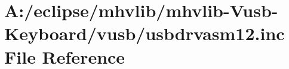 \hypertarget{mhvlib-_vusb-_keyboard_2vusb_2usbdrvasm12_8inc}{\section{A\-:/eclipse/mhvlib/mhvlib-\/\-Vusb-\/\-Keyboard/vusb/usbdrvasm12.inc File Reference}
\label{mhvlib-_vusb-_keyboard_2vusb_2usbdrvasm12_8inc}
}

